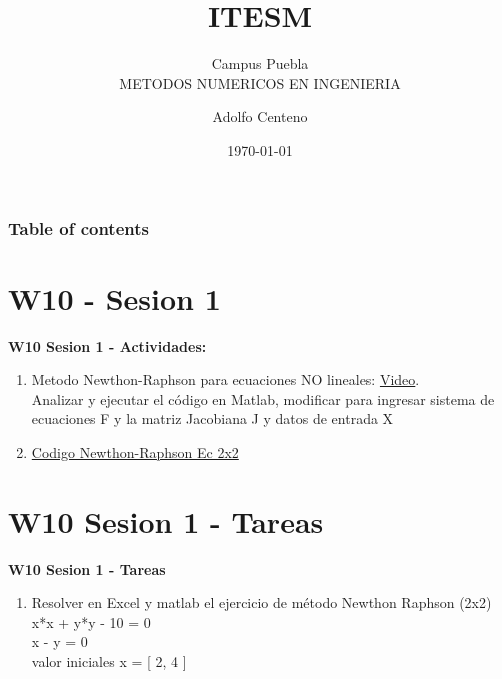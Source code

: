 \documentclass{beamer}
\begin{document}
\title{ITESM}  
\subtitle{Campus Puebla\\METODOS NUMERICOS EN INGENIERIA
}
\author{Adolfo Centeno}
\date{\today} 


\begin{frame}
\titlepage
\end{frame}

\begin{frame}\frametitle{Table of contents}
\tableofcontents
\end{frame} 


\section{W10 - Sesion 1 }

\begin{frame}

\textbf{W10 Sesion 1 - Actividades:}

\begin{enumerate}
\item
	Metodo Newthon-Raphson para ecuaciones NO lineales: \href{https://www.youtube.com/watch?v=QS3wqOQabVY}{Video}.\\Analizar y ejecutar el código en Matlab, modificar para ingresar sistema de ecuaciones F y la matriz Jacobiana J y datos de entrada X	

\item
	\href{https://github.com/adsoftsito/metodos-numericos/blob/master/w10/newthon-raphson/newton_raphson_2.pdf}{Codigo Newthon-Raphson Ec 2x2} 
	

\end{enumerate} 

\end{frame}


\section{W10 Sesion 1 - Tareas }

\begin{frame}


\textbf{W10 Sesion 1 - Tareas}


\begin{enumerate}
\item

Resolver en Excel y matlab el ejercicio de método Newthon Raphson (2x2) \\

x*x +  y*y - 10 = 0 \\
x -  y   = 0 \\

valor iniciales x = [ 2, 4 ]

\end{enumerate} 


\end{frame}
\end{document}
